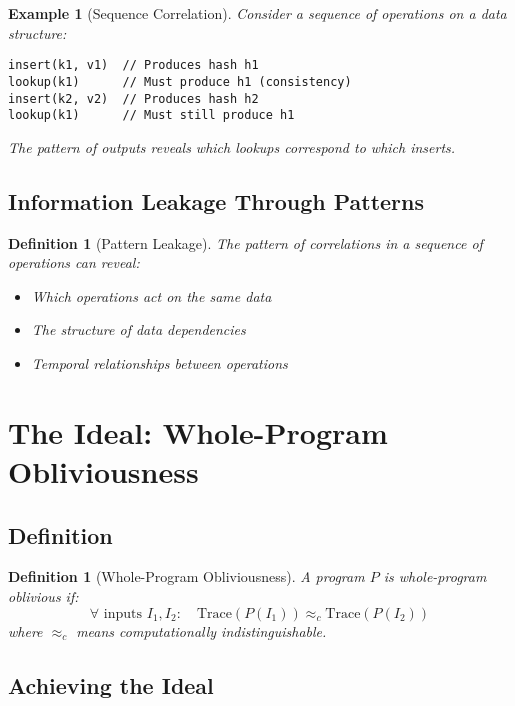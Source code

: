 \documentclass[11pt,final,hidelinks]{article}
\newtheorem{definition}[theorem]{Definition}
\newtheorem{example}[theorem]{Example}
\begin{document}
\begin{example}[Sequence Correlation]
Consider a sequence of operations on a data structure:
\begin{verbatim}
insert(k1, v1)  // Produces hash h1
lookup(k1)      // Must produce h1 (consistency)
insert(k2, v2)  // Produces hash h2
lookup(k1)      // Must still produce h1
\end{verbatim}
The pattern of outputs reveals which lookups correspond to which inserts.
\end{example}

\subsection{Information Leakage Through Patterns}

\begin{definition}[Pattern Leakage]
The pattern of correlations in a sequence of operations can reveal:
\begin{itemize}
    \item Which operations act on the same data
    \item The structure of data dependencies
    \item Temporal relationships between operations
\end{itemize}
\end{definition}

\section{The Ideal: Whole-Program Obliviousness}

\subsection{Definition}

\begin{definition}[Whole-Program Obliviousness]
A program $P$ is whole-program oblivious if:
\begin{equation}
\forall \text{ inputs } I_1, I_2: \quad \text{Trace}(P(I_1)) \approx_c \text{Trace}(P(I_2))
\end{equation}
where $\approx_c$ means computationally indistinguishable.
\end{definition}

\subsection{Achieving the Ideal}
\end{document}
